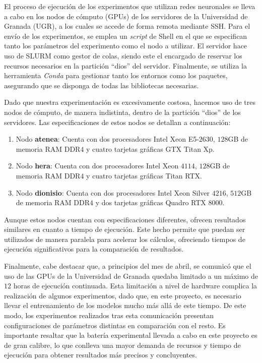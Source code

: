 El proceso de ejecución de los experimentos que utilizan redes neuronales se lleva a cabo en los nodos de cómputo (GPUs) de los servidores de la Universidad de Granada (UGR), a los cuales se accede de forma remota mediante SSH. Para el envío de los experimentos, se emplea un \textit{script} de Shell en el que se especifican tanto los parámetros del experimento como el nodo a utilizar. El servidor hace uso de SLURM como gestor de colas, siendo este el encargado de reservar los recursos necesarios en la partición ``dios'' del servidor. Finalmente, se utiliza la herramienta \textit{Conda} para gestionar tanto los entornos como los paquetes, asegurando que se disponga de todas las bibliotecas necesarias.

Dado que nuestra experimentación es excesivamente costosa, hacemos uso de tres nodos de cómputo, de manera indistinta, dentro de la partición ``dios'' de los servidores. Las especificaciones de estos nodos se detallan a continuación:

\begin{enumerate}
    \item Nodo \textbf{atenea}: Cuenta con dos procesadores Intel Xeon E5-$2630$, $128$GB de memoria RAM DDR$4$ y cuatro tarjetas gráficas GTX Titan Xp.
    \item Nodo \textbf{hera}: Cuenta con dos procesadores Intel Xeon $4114$, $128$GB de memoria RAM DDR$4$ y cuatro tarjetas gráficas Titan RTX.
    \item Nodo \textbf{dionisio}: Cuenta con dos procesadores Intel Xeon Silver $4216$, $512$GB de memoria RAM DDR$4$ y dos tarjetas gráficas Quadro RTX $8000$.
\end{enumerate}

Aunque estos nodos cuentan con especificaciones diferentes, ofrecen resultados similares en cuanto a tiempo de ejecución. Este hecho permite que puedan ser utilizados de manera paralela para acelerar los cálculos, ofreciendo tiempos de ejecución significativos para la comparación de resultados.

Finalmente, cabe destacar que, a principios del mes de abril, se comunicó que el uso de las GPUs de la Universidad de Granada quedaba limitado a un máximo de $12$ horas de ejecución continuada. Esta limitación a nivel de hardware complica la realización de algunos experimentos, dado que, en este proyecto, es necesario llevar el entrenamiento de los modelos mucho más allá de este tiempo. De este modo, los experimentos realizados tras esta comunicación presentan configuraciones de parámetros distintas en comparación con el resto. Es importante resaltar que la batería experimental llevada a cabo en este proyecto es de gran calibre, lo que conlleva una mayor demanda de recursos y tiempo de ejecución para obtener resultados más precisos y concluyentes.


